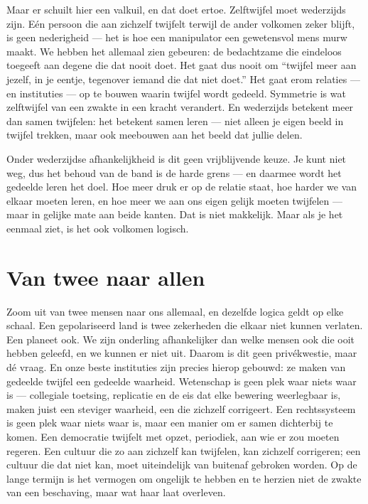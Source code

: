 \documentclass{article}
\begin{document}
Maar er schuilt hier een valkuil, en dat doet ertoe. Zelftwijfel moet wederzijds zijn. Eén persoon die aan zichzelf twijfelt terwijl de ander volkomen zeker blijft, is geen nederigheid --- het is hoe een manipulator een gewetensvol mens murw maakt. We hebben het allemaal zien gebeuren: de bedachtzame die eindeloos toegeeft aan degene die dat nooit doet. Het gaat dus nooit om \enquote{twijfel meer aan jezelf, in je eentje, tegenover iemand die dat niet doet.} Het gaat erom relaties --- en instituties --- op te bouwen waarin twijfel wordt gedeeld. Symmetrie is wat zelftwijfel van een zwakte in een kracht verandert. En wederzijds betekent meer dan samen twijfelen: het betekent samen leren --- niet alleen je eigen beeld in twijfel trekken, maar ook meebouwen aan het beeld dat jullie delen.

Onder wederzijdse afhankelijkheid is dit geen vrijblijvende keuze. Je kunt niet weg, dus het behoud van de band is de harde grens --- en daarmee wordt het gedeelde leren het doel. Hoe meer druk er op de relatie staat, hoe harder we van elkaar moeten leren, en hoe meer we aan ons eigen gelijk moeten twijfelen --- maar in gelijke mate aan beide kanten. Dat is niet makkelijk. Maar als je het eenmaal ziet, is het ook volkomen logisch.

\section*{Van twee naar allen}

Zoom uit van twee mensen naar ons allemaal, en dezelfde logica geldt op elke schaal. Een gepolariseerd land is twee zekerheden die elkaar niet kunnen verlaten. Een planeet ook. We zijn onderling afhankelijker dan welke mensen ook die ooit hebben geleefd, en we kunnen er niet uit. Daarom is dit geen privékwestie, maar dé vraag. En onze beste instituties zijn precies hierop gebouwd: ze maken van gedeelde twijfel een gedeelde waarheid. Wetenschap is geen plek waar niets waar is --- collegiale toetsing, replicatie en de eis dat elke bewering weerlegbaar is, maken juist een steviger waarheid, een die zichzelf corrigeert. Een rechtssysteem is geen plek waar niets waar is, maar een manier om er samen dichterbij te komen. Een democratie twijfelt met opzet, periodiek, aan wie er zou moeten regeren. Een cultuur die zo aan zichzelf kan twijfelen, kan zichzelf corrigeren; een cultuur die dat niet kan, moet uiteindelijk van buitenaf gebroken worden. Op de lange termijn is het vermogen om ongelijk te hebben en te herzien niet de zwakte van een beschaving, maar wat haar laat overleven.
\end{document}
